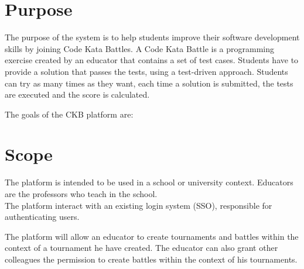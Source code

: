 \section{Purpose}
The purpose of the system is to help students improve their software development skills by joining Code Kata Battles.
A Code Kata Battle is a programming exercise created by an educator that contains a set of test cases.
Students have to provide a solution that passes the tests, using a test-driven approach.
Students can try as many times as they want, each time a solution is submitted, the tests are executed and the score is calculated.

The goals of the CKB platform are:

\begin{enumerate}[label=\textbf{G\arabic*}:,ref=G\arabic*,leftmargin=1.3cm]
\end{enumerate}

\pagebreak

\section{Scope}
The platform is intended to be used in a school or university context.
Educators are the professors who teach in the school.\\
The platform interact with an existing login system (SSO), responsible for authenticating users.

The platform will allow an educator to create tournaments and battles within the context of a tournament he have created.
The educator can also grant other colleagues the permission to create battles within the context of his tournaments.


